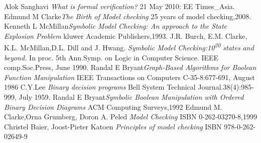 \documentclass[12pt]{report}
\begin{document}
\begin{thebibliography}{99}
 Alok Sanghavi \emph{What is formal verification?} 21 May 2010: EE Times\_Asia.
 Edmund M Clarke\emph{The Birth of Model checking} 25 years of model checking,2008.
 Kenneth L McMillan\emph{Symbolic Model Checking: An approach to the State Explosion Problem} kluwer Academic Publishers,1993.
 J.R. Burch, E.M. Clarke, K.L. McMillan,D.L. Dill and J. Hwang. \emph{Symbolic Model Checking:10\textsuperscript{20} states and beyond.} In proc. 5th Ann.Symp. on Logic in Computer Science. IEEE comp.Soc.Press, June 1990.
 Randal E Bryant\emph{Graph-Based Algorithms for Boolean Function Manipulation} IEEE Transactions on Computers C-35-8:677-691, August 1986
 C.Y.Lee \emph{Binary decision programs} Bell System Technical Journal.38(4):985-999, July 1959.
 Randal E Bryant\emph{Symbolic Boolean Manipulation with Ordered Binary Decision Diagrams} ACM Computing Surveys,1992
Edmund M. Clarke,Orna Grumberg, Doron A. Peled \emph{Model Checking} ISBN 0-262-03270-8,1999
 Christel Baier, Joost-Pieter Katoen \emph{Principles of model checking} ISBN 978-0-262-02649-9
\end{thebibliography}
\end{document}
